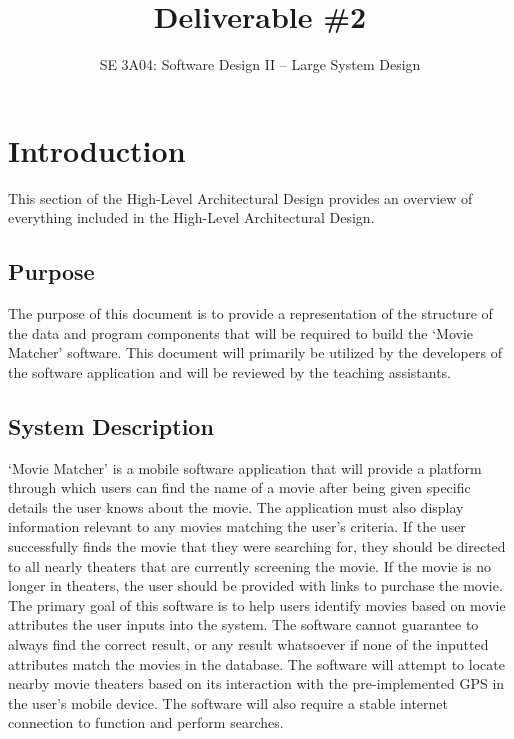 \documentclass[]{article}
\title{Deliverable \#2}
\author{SE 3A04: Software Design II -- Large System Design}
\date{}
\begin{document}
\maketitle	

\section{Introduction}
\label{sec:introduction}

This section of the High-Level Architectural Design provides an overview of everything included in the High-Level Architectural Design. 

\subsection{Purpose}
\label{sub:purpose}
The purpose of this document is to provide a representation of the structure of the data and program components that will be required to build the ‘Movie Matcher’ software. This document will primarily be utilized by the developers of the software application and will be reviewed by the teaching assistants. 

\subsection{System Description}
\label{sub:system_description}
‘Movie Matcher’ is a mobile software application that will provide a platform through which users can find the name of a movie after being given specific details the user knows about the movie. The application must also display information relevant to any movies matching the user’s criteria. If the user successfully finds the movie that they were searching for, they should be directed to all nearly theaters that are currently screening the movie. If the movie is no longer in theaters, the user should be provided with links to purchase the movie. 
The primary goal of this software is to help users identify movies based on movie attributes the user inputs into the system. The software cannot guarantee to always find the correct result, or any result whatsoever if none of the inputted attributes match the movies in the database. The software will attempt to locate nearby movie theaters based on its interaction with the pre-implemented GPS in the user’s mobile device. The software will also require a stable internet connection to function and perform searches. 
\end{document}

